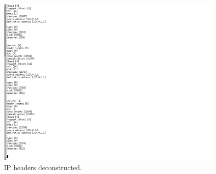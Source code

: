 \documentclass[titlepage]{article}
\begin{document}
\begin{figure}[h]
  \centering
  \includegraphics[width=\textwidth]{../screenshots/deconstructed_headers.png}
  \caption{IP headers deconstructed.}
\end{figure}

\blindtext
\blindtext
\blindtext
\end{document}
